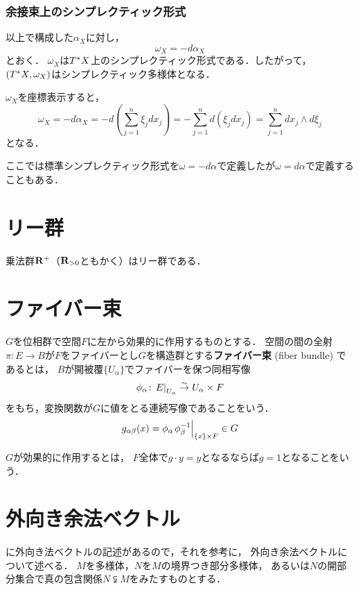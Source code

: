 \subsubsection*{余接束上のシンプレクティック形式}
以上で構成した\(\alpha_X\)に対し，\[\omega_X=-d\alpha_X\]とおく．
\(\omega_X\)は\(\cotb[X]\)上のシンプレクティック形式である．したがって，
\((\cotb[X],\omega_X)\)はシンプレクティック多様体となる．

\(\omega_X\)を座標表示すると，
\[
    \omega_X=-d\alpha_{X}
    =-d\left(\sum_{j=1}^{n}\xi_{j}dx_{j}\right)
    =-\sum_{j=1}^{n}d(\xi_{j}dx_{j})
    =\sum_{j=1}^{n}dx_{j}\wedge d\xi_{j} 
\]
となる．

\begin{CMT}
  ここでは標準シンプレクティック形式を\(\omega=-d\alpha\)で定義したが\(\omega=d\alpha\)で定義することもある．
\end{CMT}

\clearpage
\section{リー群}
\begin{EG}
  乗法群\(\rr^{+}\)（\(\rr_{>0}\)ともかく）はリー群である．
\end{EG}

\clearpage
\section{ファイバー束}
\begin{leftbar}
\begin{DFN}
  \(G\)を位相群で空間\(F\)に左から効果的に作用するものとする．
  空間の間の全射\(\pi\colon E\to B\)が\(F\)をファイバーとし\(G\)を構造群とする\textbf{ファイバー束} (fiber bundle) であるとは，
  \(B\)が開被覆\(\{U_{\alpha}\}\)でファイバーを保つ同相写像\[
    \phi_{\alpha}\colon
    \mres[E]{U_{\alpha}}\simar U_{\alpha}\times F
  \]をもち，変換関数が\(G\)に値をとる連続写像であることをいう．
  \[
    g_{\alpha\beta}(x)=\phi_{\alpha}\mres[\phi_{\beta}^{-1}]{\{x\}\times F}\in G
  \]
\end{DFN}
\end{leftbar}

\(G\)が効果的に作用するとは，
\(F\)全体で\(g\cdot y=y\)となるならば\(g=1\)となることをいう．



\section{外向き余法ベクトル}
\cite{GP74,Hat89}に外向き法ベクトルの記述があるので，それを参考に，
外向き余法ベクトルについて述べる．
\(M\)を多様体，\(N\)を\(M\)の境界つき部分多様体，
あるいは\(N\)の開部分集合で真の包含関係\(N\subsetneqq M\)をみたすものとする．

